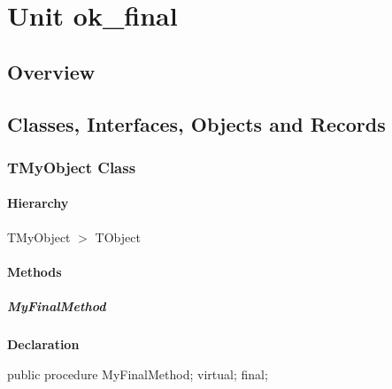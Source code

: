 \documentclass{report}
\begin{document}
\newlength{\tmplength}
\chapter{Unit ok{\_}final}
\section{Overview}
\begin{description}
\item[\texttt{\begin{ttfamily}TMyObject\end{ttfamily} Class}]
\end{description}
\section{Classes, Interfaces, Objects and Records}
\subsection*{TMyObject Class}
\subsubsection*{\large{\textbf{Hierarchy}}\normalsize\hspace{1ex}\hfill}
TMyObject {$>$} TObject
\subsubsection*{\large{\textbf{Methods}}\normalsize\hspace{1ex}\hfill}
\paragraph*{MyFinalMethod}\hspace*{\fill}

\begin{list}{}{
\setlength{\itemindent}{0cm}
\setlength{\listparindent}{0cm}
\setlength{\leftmargin}{\evensidemargin}
\addtolength{\leftmargin}{\tmplength}
\settowidth{\labelsep}{X}
\addtolength{\leftmargin}{\labelsep}
\setlength{\labelwidth}{\tmplength}
}
\begin{flushleft}
\item[\textbf{Declaration}\hfill]
\begin{ttfamily}
public procedure MyFinalMethod; virtual; final;\end{ttfamily}


\end{flushleft}
\end{list}
\end{document}
